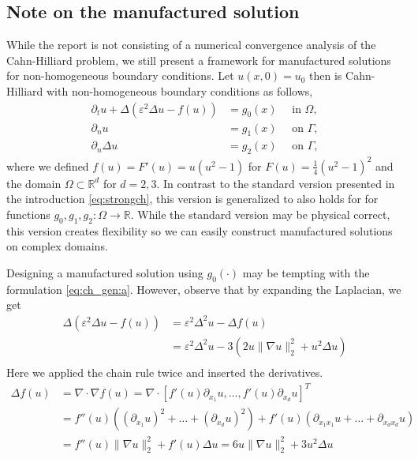\documentclass[11pt]{article}
\theoremstyle{remark}
\numberwithin{equation}{section}
\begin{document}
\subsection{Note on the manufactured solution}%
\label{sub:the_problem}

While the report is not consisting of a numerical convergence analysis of the Cahn-Hilliard problem, we still present a framework for manufactured solutions for non-homogeneous boundary conditions. Let $ u( x,0) =  u_{0}$ then is Cahn-Hilliard with
non-homogeneous boundary conditions as follows,
\begin{subequations}
    \label{eq:ch_gen}
    \begin{align}
    \label{eq:ch_gen:a}
        \partial _{t} u + \Delta  \left(  \varepsilon^2  \Delta u - f( u) \right)   &= g_{0}( x)   \quad \text{ in } \Omega,  \\
        \partial _{n} u &= g_{1}( x)  \quad \text{ on } \Gamma,  \\
        \partial _{n}    \Delta u   &= g_{2}(x)  \quad \text{ on } \Gamma,
    \end{align}
\end{subequations}
where we defined $f( u) = F'( u) =u( u^2 -1)  $ for $F( u) = \frac{1}{4}( u^{2} - 1)^{2} $ and the domain $\Omega \subset \mathbb{R} ^{d} $  for $d = 2,3$. In contrast to the standard version presented in the introduction \eqref{eq:strongch}, this
version is generalized to also holds for for functions $g_{0},g_{1},g_{2}: \Omega \to\mathbb{R}   $. While the standard version may be physical correct, this version creates flexibility so we can easily construct manufactured solutions on complex domains.

    Designing a manufactured solution using $g_{0}( \cdot ) $ may be tempting with the formulation \eqref{eq:ch_gen:a}. However, observe that by expanding the Laplacian, we get
    \begin{equation}
    \begin{split}
        \Delta  \left(  \varepsilon^2  \Delta u - f( u) \right) & = \varepsilon^2 \Delta^2 u -  \Delta f( u) \\
                                                                                    &= \varepsilon^{2} \Delta ^2 u  - 3( 2u \| \nabla u \|_{ 2 }^{ 2 } + u^{2}  \Delta u )   \\
    \end{split}
    \end{equation}
Here we applied the chain rule twice and inserted the derivatives.
\begin{equation}
    \label{eq:nonlinear_laplace}
    \begin{split}
\Delta f( u)  &= \nabla \cdot \nabla f( u)  = \nabla \cdot  \left[ f' ( u) \partial _{x_{1}}u, \ldots, f' ( u) \partial _{x_{d}}u \right] ^{T} \\
& =  f'' ( u)( ( \partial _{x_{1}}u )^{2} + \ldots +( \partial _{x_{d}}u )^{2} ) +  f' ( u)( \partial _{x_{1} x_{1}}u + \ldots +   \partial _{x_{d} x_{d}}u ) \\
&=  f'' ( u) \| \nabla u \|_{ 2 }^{ 2 } + f' ( u)  \Delta u  = 6u \| \nabla u \|_{ 2 }^{ 2 } + 3u^{2}  \Delta u
    \end{split}
\end{equation}
\end{document}

